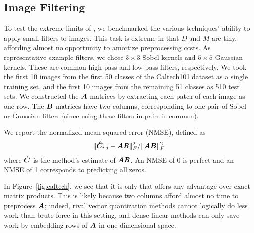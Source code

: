 \subsection{Image Filtering}

To test the extreme limits of \ours, we benchmarked the various techniques' ability to apply small filters to images. This task is extreme in that $D$ and $M$ are tiny, affording almost no opportunity to amortize preprocessing costs. As representative example filters, we chose $3 \times 3$ Sobel kernels and $5 \times 5$ Gaussian kernels. These are common high-pass and low-pass filters, respectively. We took the first 10 images from the first 50 classes of the Caltech101 dataset \cite{caltech} as a single training set, and the first 10 images from the remaining 51 classes as 510 test sets. We constructed the $\bm{A}$ matrices by extracting each patch of each image as one row. The $\bm{B}$ matrices have two columns, corresponding to one pair of Sobel or Gaussian filters (since using these filters in pairs is common). %


We report the normalized mean-squared error (NMSE), defined as
\begin{align}
    \lVert\bm{\hat{C}}_{i,j} - \bm{A}\bm{B}\rVert^2_F / \lVert\bm{A}\bm{B}\rVert^2_F
\end{align}
where $\hat{\bm{C}}$ is the method's estimate of $\bm{A}\bm{B}$. An NMSE of 0 is perfect and an NMSE of 1 corresponds to predicting all zeros.

In Figure~\ref{fig:caltech}, we see that it is only \oursp that offers any advantage over exact matrix products. This is likely because two columns afford almost no time to preprocess $\bm{A}$; indeed, rival vector quantization methods cannot logically do less work than brute force in this setting, and dense linear methods can only save work by embedding rows of $\bm{A}$ in one-dimensional space.

